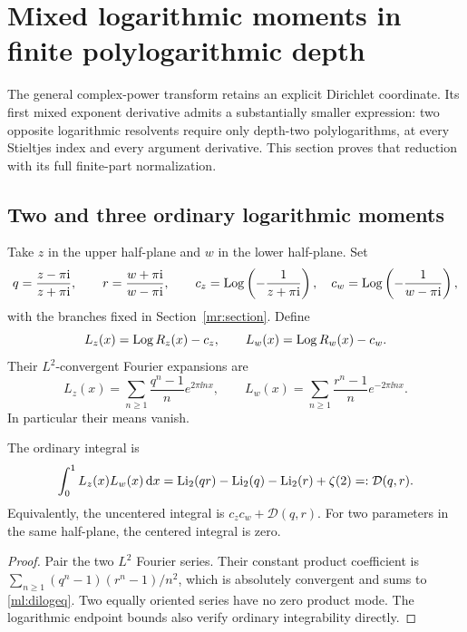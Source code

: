 \section{Mixed logarithmic moments in finite polylogarithmic depth}
\label{ml:section}

The general complex-power transform retains an explicit Dirichlet
coordinate. Its first mixed exponent derivative admits a substantially
smaller expression: two opposite logarithmic resolvents require only
depth-two polylogarithms, at every Stieltjes index and every argument
derivative. This section proves that reduction with its full finite-part
normalization.

\subsection{Two and three ordinary logarithmic moments}

Take $z$ in the upper half-plane and $w$ in the lower half-plane. Set
\[
 q=\frac{z-\pi\mathrm i}{z+\pi\mathrm i},\qquad
 r=\frac{w+\pi\mathrm i}{w-\pi\mathrm i},\qquad
 c_z=\operatorname{Log}\left(-\frac1{z+\pi\mathrm i}\right),\quad
 c_w=\operatorname{Log}\left(-\frac1{w-\pi\mathrm i}\right),
\]
with the branches fixed in Section~\ref{mr:section}. Define
\[
 L_z(x)=\operatorname{Log} R_z(x)-c_z,\qquad
 L_w(x)=\operatorname{Log} R_w(x)-c_w.
\]
Their $L^2$-convergent Fourier expansions are
\begin{equation}\label{ml:Fourierlog}
 L_z(x)=\sum_{n\ge1}\frac{q^n-1}{n}e^{2\pi\ii nx},\qquad
 L_w(x)=\sum_{n\ge1}\frac{r^n-1}{n}e^{-2\pi\ii nx}.
\end{equation}
In particular their means vanish.

\begin{proposition}
\label{ml:dilog}
The ordinary integral is
\begin{equation}\label{ml:dilogeq}
 \int_0^1L_z(x)L_w(x)\,\mathrm d x
       =\operatorname{Li}_2(qr)-\operatorname{Li}_2(q)-\operatorname{Li}_2(r)+\zeta(2)=:\mathcal D(q,r).
\end{equation}
Equivalently, the uncentered integral is $c_zc_w+\mathcal D(q,r)$.
For two parameters in the same half-plane, the centered integral is zero.
\end{proposition}
\begin{proof}
Pair the two $L^2$ Fourier series. Their constant product coefficient
is $\sum_{n\ge1}(q^n-1)(r^n-1)/n^2$, which is absolutely
convergent and sums to \eqref{ml:dilogeq}. Two equally oriented
series have no zero product mode. The logarithmic endpoint bounds
also verify ordinary integrability directly.
\end{proof}

